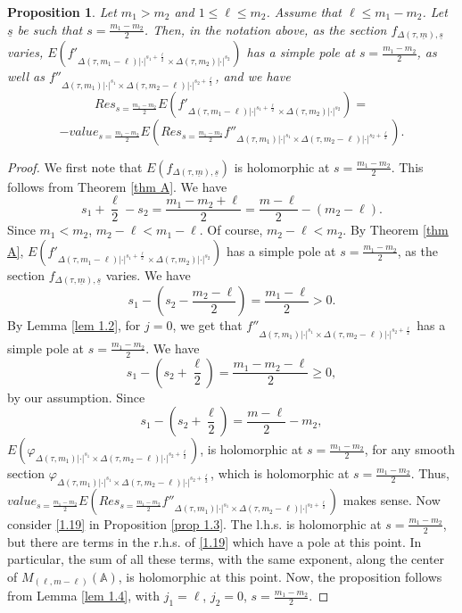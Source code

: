 \documentclass[12pts]{amsart}
\newcommand{\BA}{{\mathbb {A}}}
\newtheorem{prop}[thm]{Proposition}
\begin{document}
     \begin{prop}\label{prop 2.1}
     Let $m_1> m_2$ and $1\leq \ell \leq m_2$. Assume that $\ell\leq m_1-m_2$. Let $\underline{s}$ be such that $s=\frac{m_1-m_2}{2}$. Then, in the notation above, as the section $f_{\Delta(\tau,\underline{m}),\underline{s}}$ varies, $E(f'_{\Delta(\tau,m_1-\ell)|\cdot|^{s_1+\frac{\ell}{2}}\times \Delta(\tau,m_2)|\cdot|^{s_2}})$ has a simple pole at $s=\frac{m_1-m_2}{2}$, as well as $f''_{\Delta(\tau,m_1)|\cdot|^{s_1}\times \Delta(\tau,m_2-\ell)|\cdot|^{s_2+\frac{\ell}{2}}}$, and we have
     \begin{equation}\label{2.3}
     Res_{s=\frac{m_1-m_2}{2}}E(f'_{\Delta(\tau,m_1-\ell)|\cdot|^{s_1+\frac{\ell}{2}}\times \Delta(\tau,m_2)|\cdot|^{s_2}})=
     	\end{equation}
     	$$
     	-value_{s=\frac{m_1-m_2}{2}}E(Res_{s=\frac{m_1-m_2}{2}}f''_{\Delta(\tau,m_1)|\cdot|^{s_1}\times \Delta(\tau,m_2-\ell)|\cdot|^{s_2+\frac{\ell}{2}}}).
     	$$
     	\end{prop}
     	\begin{proof}
     	We first note that $E(f_{\Delta(\tau,\underline{m}),\underline{s}})$ is holomorphic at $s=\frac{m_1-m_2}{2}$. This follows from Theorem \ref{thm A}. We have
     	$$
     	s_1+\frac{\ell}{2}-s_2=\frac{m_1-m_2+\ell}{2}=\frac{m-\ell}{2}-(m_2-\ell).
     	$$
     	Since $m_1<m_2$, $m_2-\ell<m_1-\ell$. Of course, $m_2-\ell<m_2$. By Theorem \ref{thm A}, $E(f'_{\Delta(\tau,m_1-\ell)|\cdot|^{s_1+\frac{\ell}{2}}\times \Delta(\tau,m_2)|\cdot|^{s_2}})$ has a simple pole at $s=\frac{m_1-m_2}{2}$, as the section $f_{\Delta(\tau,\underline{m}),\underline{s}}$ varies. We have 
     	$$
     	s_1-(s_2-\frac{m_2-\ell}{2})=\frac{m_1-\ell}{2}> 0.
     	$$
     	By Lemma \ref{lem 1.2}, for $j=0$, we get that $f''_{\Delta(\tau,m_1)|\cdot|^{s_1}\times \Delta(\tau,m_2-\ell)|\cdot|^{s_2+\frac{\ell}{2}}}$ has a simple pole at $s=\frac{m_1-m_2}{2}$. 
     	We have
     	$$
     	s_1-(s_2+\frac{\ell}{2})=\frac{m_1-m_2-\ell}{2}\geq 0,
     	$$
     	by our assumption. Since
     	$$
     	s_1-(s_2+\frac{\ell}{2})=\frac{m-\ell}{2}-m_2,
     	$$
     	$E(\varphi_{\Delta(\tau,m_1)|\cdot|^{s_1}\times \Delta(\tau,m_2-\ell)|\cdot|^{s_2+\frac{\ell}{2}}})$, is holomorphic at $s=\frac{m_1-m_2}{2}$, for any smooth section $\varphi_{\Delta(\tau,m_1)|\cdot|^{s_1}\times \Delta(\tau,m_2-\ell)|\cdot|^{s_2+\frac{\ell}{2}}}$, which is holomorphic at $s=\frac{m_1-m_2}{2}$. Thus, $value_{s=\frac{m_1-m_2}{2}}E(Res_{s=\frac{m_1-m_2}{2}}f''_{\Delta(\tau,m_1)|\cdot|^{s_1}\times \Delta(\tau,m_2-\ell)|\cdot|^{s_2+\frac{\ell}{2}}})$ makes sense. Now consider \eqref{1.19} in Proposition \ref{prop 1.3}. The l.h.s. is holomorphic at $s=\frac{m_1-m_2}{2}$, but there are terms in the r.h.s. of \eqref{1.19} which have a pole at this point. In particular, the sum of all these terms, with the same exponent, along the center of $M_{(\ell,m-\ell)}(\BA)$, is holomorphic at this point. Now, the proposition follows from Lemma \ref{lem 1.4}, with $j_1=\ell$, $j_2=0$, $s=\frac{m_1-m_2}{2}$.
     	
     	
     	\end{proof}
     
\end{document}
